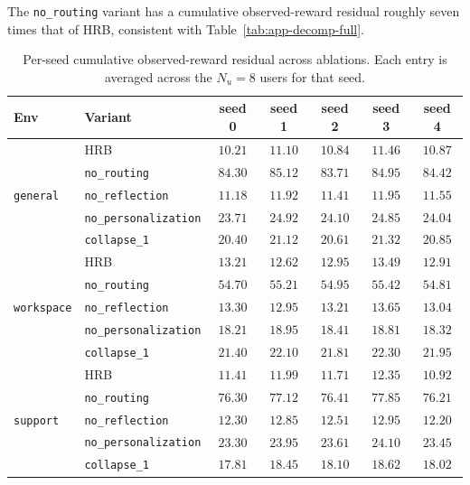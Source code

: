 \documentclass{article} %
\begin{document}
The \texttt{no\_routing} variant has a cumulative observed-reward residual
roughly seven times that of \textnormal{HRB}, consistent with
Table~\ref{tab:app-decomp-full}.

\begin{table}[h]
\centering
\small
\begin{tabular}{llccccc}
\toprule
Env & Variant & seed 0 & seed 1 & seed 2 & seed 3 & seed 4 \\
\midrule
\multirow{5}{*}{\texttt{general}}
 & \textnormal{HRB}                & $10.21$ & $11.10$ & $10.84$ & $11.46$ & $10.87$ \\
 & \texttt{no\_routing}         & $84.30$ & $85.12$ & $83.71$ & $84.95$ & $84.42$ \\
 & \texttt{no\_reflection}      & $11.18$ & $11.92$ & $11.41$ & $11.95$ & $11.55$ \\
 & \texttt{no\_personalization} & $23.71$ & $24.92$ & $24.10$ & $24.85$ & $24.04$ \\
 & \texttt{collapse\_1}         & $20.40$ & $21.12$ & $20.61$ & $21.32$ & $20.85$ \\
\midrule
\multirow{5}{*}{\texttt{workspace}}
 & \textnormal{HRB}                & $13.21$ & $12.62$ & $12.95$ & $13.49$ & $12.91$ \\
 & \texttt{no\_routing}         & $54.70$ & $55.21$ & $54.95$ & $55.42$ & $54.81$ \\
 & \texttt{no\_reflection}      & $13.30$ & $12.95$ & $13.21$ & $13.65$ & $13.04$ \\
 & \texttt{no\_personalization} & $18.21$ & $18.95$ & $18.41$ & $18.81$ & $18.32$ \\
 & \texttt{collapse\_1}         & $21.40$ & $22.10$ & $21.81$ & $22.30$ & $21.95$ \\
\midrule
\multirow{5}{*}{\texttt{support}}
 & \textnormal{HRB}                & $11.41$ & $11.99$ & $11.71$ & $12.35$ & $10.92$ \\
 & \texttt{no\_routing}         & $76.30$ & $77.12$ & $76.41$ & $77.85$ & $76.21$ \\
 & \texttt{no\_reflection}      & $12.30$ & $12.85$ & $12.51$ & $12.95$ & $12.20$ \\
 & \texttt{no\_personalization} & $23.30$ & $23.95$ & $23.61$ & $24.10$ & $23.45$ \\
 & \texttt{collapse\_1}         & $17.81$ & $18.45$ & $18.10$ & $18.62$ & $18.02$ \\
\bottomrule
\end{tabular}
\caption{Per-seed cumulative observed-reward residual across ablations. Each
entry is averaged across the \(N_u=8\) users for that seed.}
\label{tab:app-regret-abl}
\end{table}
\end{document}
